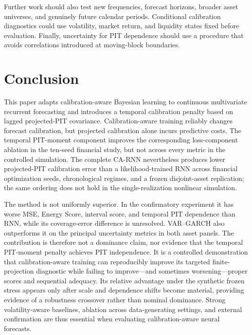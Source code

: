 \documentclass[11pt]{article}
\begin{document}
Further work should also test new frequencies, forecast horizons, broader asset
universes, and genuinely future calendar periods. Conditional calibration
diagnostics could use volatility, market return, and liquidity states fixed
before evaluation. Finally, uncertainty for PIT dependence should use a
procedure that avoids correlations introduced at moving-block boundaries.

\section{Conclusion}

This paper adapts calibration-aware Bayesian learning to continuous multivariate
recurrent forecasting and introduces a temporal calibration penalty based on
lagged projected-PIT covariance. Calibration-aware training reliably changes
forecast calibration, but projected calibration alone incurs predictive costs.
The temporal PIT-moment component improves the corresponding loss-component
ablation in the ten-seed financial study, but not across every metric in the
controlled simulation. The complete CA-RNN nevertheless produces lower
projected-PIT calibration error than a likelihood-trained RNN across financial
optimization seeds, chronological regimes, and a frozen disjoint-asset
replication; the same ordering does not hold in the single-realization nonlinear
simulation.

The method is not uniformly superior. In the confirmatory experiment it has worse
MSE, Energy Score, interval score, and temporal PIT dependence than RNN, while its
coverage-error difference is unresolved. VAR--GARCH also outperforms it on the
principal uncertainty metrics in both asset panels. The contribution is therefore
not a dominance claim, nor evidence that the temporal PIT-moment penalty achieves
PIT independence. It is a controlled demonstration that calibration-aware
training can reproducibly improve its targeted finite-projection diagnostic while
failing to improve---and sometimes worsening---proper scores and sequential
adequacy. Its relative advantage under the synthetic frozen stress appears only
after scale and dependence shifts become material, providing evidence of a
robustness crossover rather than nominal dominance. Strong volatility-aware
baselines, ablation across data-generating settings, and external confirmation
are thus essential when evaluating calibration-aware neural forecasts.

\newpage
\appendix
\end{document}
